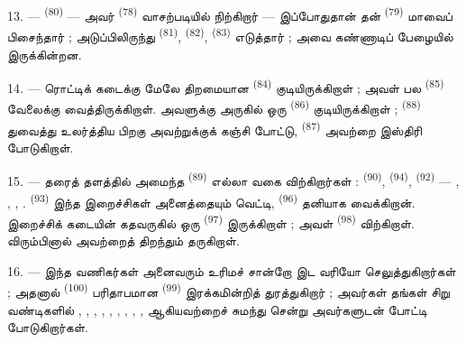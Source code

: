 13. ---  \textsuperscript{(80)} —
அவர்  \textsuperscript{(78)} வாசற்படியில்
நிற்கிறார் — இப்போதுதான் தன் 
\textsuperscript{(79)} மாவைப் பிசைந்தார் ; அடுப்பிலிருந்து
 \textsuperscript{(81)},  \textsuperscript{(82)},  \textsuperscript{(83)} எடுத்தார் ; அவை கண்ணாடிப்
பேழையில் இருக்கின்றன.

14. --- ரொட்டிக் கடைக்கு மேலே திறமையான  \textsuperscript{(84)} குடியிருக்கிறாள் ; அவள் பல
 \textsuperscript{(85)}
வேலைக்கு வைத்திருக்கிறாள். அவளுக்கு அருகில் ஒரு  \textsuperscript{(86)} குடியிருக்கிறாள் ;
 \textsuperscript{(88)} துவைத்து உலர்த்திய பிறகு
அவற்றுக்குக் கஞ்சி போட்டு, 
\textsuperscript{(87)} அவற்றை இஸ்திரி போடுகிறாள்.

\VUsaut{4.0mm}
\VUsaut{3.0mm}

15. --- தரைத் தளத்தில் அமைந்த 
\textsuperscript{(89)} எல்லா வகை 
விற்கிறார்கள் :  \textsuperscript{(90)},
 \textsuperscript{(94)},  \textsuperscript{(92)} — ,
, ,
. 
\textsuperscript{(93)} இந்த இறைச்சிகள் அனைத்தையும் வெட்டி,
 \textsuperscript{(96)} தனியாக
வைக்கிறான். இறைச்சிக் கடையின் கதவருகில் ஒரு  \textsuperscript{(97)} இருக்கிறாள் ; அவள்
 \textsuperscript{(98)} விற்கிறாள். விரும்பினால்
அவற்றைத் திறந்தும் தருகிறாள்.

16. --- இந்த வணிகர்கள் அனைவரும் உரிமச் சான்றோ இட வரியோ
செலுத்துகிறார்கள் ; அதனால் 
\textsuperscript{(100)} பரிதாபமான  \textsuperscript{(99)} இரக்கமின்றித் துரத்துகிறார் ;
அவர்கள் தங்கள் சிறு வண்டிகளில் , ,
, , , , ,
, ,
 ஆகியவற்றைச் சுமந்து சென்று அவர்களுடன்
போட்டி போடுகிறார்கள்.

\VUsaut{4.0mm}
\VUsaut{3.0mm}

